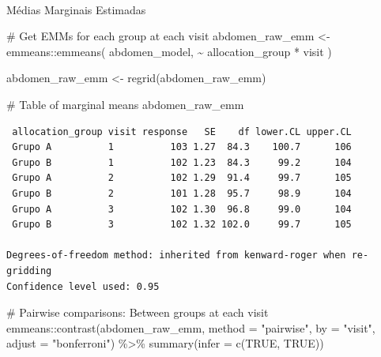 \documentclass[
  letterpaper,
  DIV=11,
  numbers=noendperiod]{scrartcl}
\makeatletter
\let\oldparagraph\paragraph
\renewcommand{\paragraph}{
    \@ifstar
      \xxxParagraphStar
      \xxxParagraphNoStar
  }
\newcommand{\xxxParagraphStar}[1]{\oldparagraph*{#1}\mbox{}}
\newcommand{\xxxParagraphNoStar}[1]{\oldparagraph{#1}\mbox{}}
\newenvironment{Shaded}{\begin{snugshade}}{\end{snugshade}}
\newcommand{\AttributeTok}[1]{\textcolor[rgb]{0.40,0.45,0.13}{#1}}
\newcommand{\CommentTok}[1]{\textcolor[rgb]{0.37,0.37,0.37}{#1}}
\newcommand{\ConstantTok}[1]{\textcolor[rgb]{0.56,0.35,0.01}{#1}}
\newcommand{\FunctionTok}[1]{\textcolor[rgb]{0.28,0.35,0.67}{#1}}
\newcommand{\NormalTok}[1]{\textcolor[rgb]{0.00,0.23,0.31}{#1}}
\newcommand{\OtherTok}[1]{\textcolor[rgb]{0.00,0.23,0.31}{#1}}
\newcommand{\SpecialCharTok}[1]{\textcolor[rgb]{0.37,0.37,0.37}{#1}}
\newcommand{\StringTok}[1]{\textcolor[rgb]{0.13,0.47,0.30}{#1}}
\makeatother
\begin{document}
\paragraph{Médias Marginais
Estimadas}\label{muxe9dias-marginais-estimadas-13}

\begin{Shaded}
\begin{Highlighting}[]
\CommentTok{\# Get EMMs for each group at each visit}
\NormalTok{abdomen\_raw\_emm }\OtherTok{\textless{}{-}}\NormalTok{ emmeans}\SpecialCharTok{::}\FunctionTok{emmeans}\NormalTok{(}
\NormalTok{    abdomen\_model, }
    \SpecialCharTok{\textasciitilde{}}\NormalTok{ allocation\_group }\SpecialCharTok{*}\NormalTok{ visit}
\NormalTok{)}

\NormalTok{abdomen\_raw\_emm }\OtherTok{\textless{}{-}} \FunctionTok{regrid}\NormalTok{(abdomen\_raw\_emm)}

\CommentTok{\# Table of marginal means}
\NormalTok{abdomen\_raw\_emm}
\end{Highlighting}
\end{Shaded}

\begin{verbatim}
 allocation_group visit response   SE    df lower.CL upper.CL
 Grupo A          1          103 1.27  84.3    100.7      106
 Grupo B          1          102 1.23  84.3     99.2      104
 Grupo A          2          102 1.29  91.4     99.7      105
 Grupo B          2          101 1.28  95.7     98.9      104
 Grupo A          3          102 1.30  96.8     99.0      104
 Grupo B          3          102 1.32 102.0     99.7      105

Degrees-of-freedom method: inherited from kenward-roger when re-gridding 
Confidence level used: 0.95 
\end{verbatim}

\begin{Shaded}
\begin{Highlighting}[]
\CommentTok{\# Pairwise comparisons: Between groups at each visit}
\NormalTok{emmeans}\SpecialCharTok{::}\FunctionTok{contrast}\NormalTok{(abdomen\_raw\_emm, }\AttributeTok{method =} \StringTok{"pairwise"}\NormalTok{, }\AttributeTok{by =} \StringTok{"visit"}\NormalTok{, }\AttributeTok{adjust =} \StringTok{"bonferroni"}\NormalTok{) }\SpecialCharTok{\%\textgreater{}\%} \FunctionTok{summary}\NormalTok{(}\AttributeTok{infer =} \FunctionTok{c}\NormalTok{(}\ConstantTok{TRUE}\NormalTok{, }\ConstantTok{TRUE}\NormalTok{))}
\end{Highlighting}
\end{Shaded}
\end{document}

